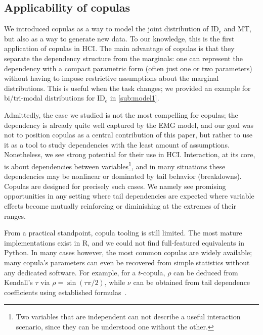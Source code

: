 \documentclass[acmlarge, manuscript,review]{acmart}
\newcommand{\ide}{\ensuremath{{\text{ID}_e}}\xspace}
\begin{document}
\subsection{Applicability of copulas}
We introduced copulas as a way to model the joint distribution of \ide and MT, but also as a way to generate new data. To our knowledge, this is the first application of copulas in HCI. The main advantage of copulas is that they separate the dependency structure from the marginals: one can represent the dependency with a compact parametric form (often just one or two parameters) without having to impose restrictive assumptions about the marginal distributions. This is useful when the task changes; we provided an example for bi/tri-modal distributions for \ide in \autoref{sub:model1}.

Admittedly, the case we studied is not the most compelling for copulas; the dependency is already quite well captured by the EMG model, and our goal was not to position copulas as a central contribution of this paper, but rather to use it as a tool to study dependencies with the least amount of assumptions. Nonetheless, we see strong potential for their use in HCI. Interaction, at its core, is about dependencies between variables\footnote{Two variables that are independent can not describe a useful interaction scenario, since they can be understood one without the other.}, and in many situations these dependencies may be nonlinear or dominated by tail behavior (\eg breakdowns). Copulas are designed for precisely such cases. We namely see promising opportunities %
in any setting where tail dependencies are expected \ie where variable effects become mutually reinforcing or diminishing at the extremes of their ranges.



From a practical standpoint, copula tooling is still limited. The most mature implementations exist in R, and we could not find full-featured equivalents in Python.  %
In many cases however, the most common copulas are widely available; many copula's parameters can even be recovered from simple statistics without any dedicated software. For example, for a $t$-copula, $\rho$ can be deduced from Kendall's $\tau$ via $\rho = \sin(\tau \pi/2)$, while $\nu$ can be obtained from tail dependence coefficients using established formulas~\cite[Section 3]{demarta2005}. 
\end{document}
